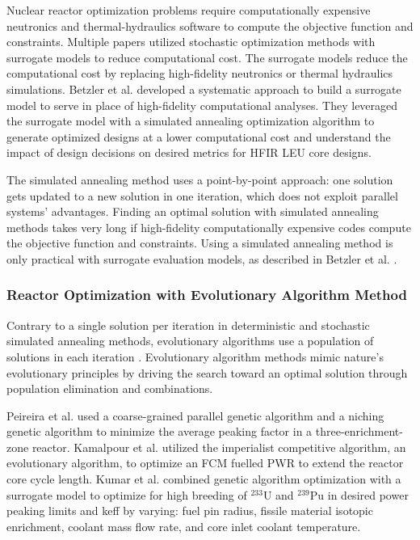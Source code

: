 Nuclear reactor optimization problems require computationally 
expensive neutronics and thermal-hydraulics software to compute the objective 
function and constraints. 
Multiple papers utilized stochastic optimization methods with surrogate models 
to reduce computational cost. 
The surrogate models reduce the computational cost by replacing high-fidelity
neutronics or thermal hydraulics simulations.
Betzler et al. \cite{betzler_design_2019} developed a systematic approach to 
build a surrogate model to serve in place of high-fidelity computational 
analyses. 
They leveraged the surrogate model with a simulated annealing optimization 
algorithm to generate optimized designs at a lower computational cost and
understand the impact of design decisions on desired metrics for \gls{HFIR} \gls{LEU} 
core designs.

The simulated annealing method uses a point-by-point approach:
one solution gets updated to a new solution in one iteration, which does not 
exploit parallel systems' advantages.
Finding an optimal solution with simulated annealing methods takes very long if 
high-fidelity computationally expensive codes compute the objective function and 
constraints.
Using a simulated annealing method is only practical with surrogate evaluation models, 
as described in Betzler et al. \cite{betzler_design_2019}.

\subsubsection{Reactor Optimization with Evolutionary Algorithm Method}
Contrary to a single solution per iteration in deterministic and stochastic 
simulated annealing methods, evolutionary algorithms use a population of 
solutions in each iteration \cite{deb_multi-objective_2001}. 
Evolutionary algorithm methods mimic nature's evolutionary principles by driving 
the search toward an optimal solution through population elimination and combinations. 

Peireira et al. \cite{pereira_coarse-grained_2003,pereira_parallel_2008} 
used a coarse-grained parallel genetic algorithm and a niching genetic algorithm
to minimize the average peaking factor in a three-enrichment-zone reactor. 
Kamalpour et al. \cite{kamalpour_smart_2020} utilized the imperialist competitive 
algorithm, an evolutionary algorithm, to optimize an \gls{FCM} fuelled 
\gls{PWR} to extend the reactor core cycle length. 
Kumar et al. \cite{kumar_new_2015} combined genetic algorithm optimization 
with a surrogate model to optimize for high breeding of $^{233}$U and $^{239}$Pu 
in desired power peaking limits and keff by varying: fuel pin 
radius,  fissile material isotopic enrichment, coolant mass flow rate, and 
core inlet coolant temperature.

